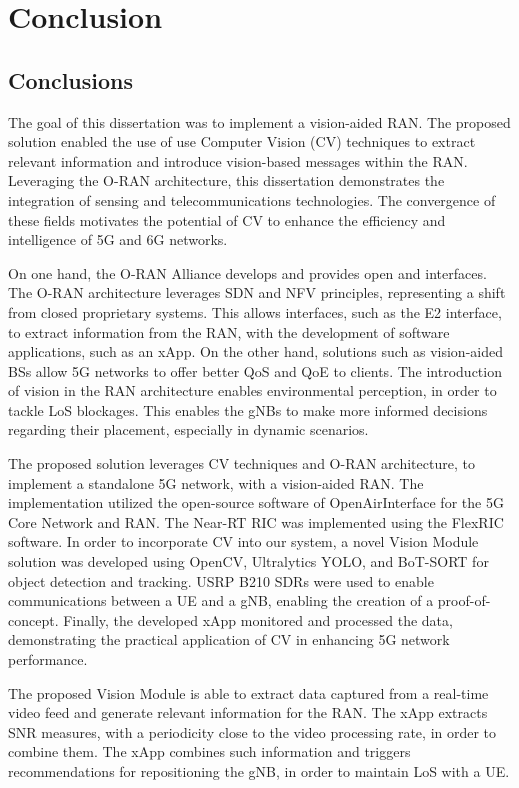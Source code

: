 \chapter{Conclusion}\label{ch:conclusion}

\section{Conclusions}\label{sec:conclusions}
The goal of this dissertation was to implement a vision-aided RAN\@.
The proposed solution enabled the use of use Computer Vision (CV) techniques to extract relevant information and introduce vision-based messages within the RAN\@.
Leveraging the O-RAN architecture, this dissertation demonstrates the integration of sensing and telecommunications technologies.
The convergence of these fields motivates the potential of CV to enhance the efficiency and intelligence of 5G and 6G networks.

On one hand, the O-RAN Alliance develops and provides open and interfaces.
The O-RAN architecture leverages SDN and NFV principles, representing a shift from closed proprietary systems.
This allows interfaces, such as the E2 interface, to extract information from the RAN, with the development of software applications, such as an xApp.
On the other hand, solutions such as vision-aided BSs allow 5G networks to offer better QoS and QoE to clients.
The introduction of vision in the RAN architecture enables environmental perception, in order to tackle LoS blockages.
This enables the gNBs to make more informed decisions regarding their placement, especially in dynamic scenarios.

The proposed solution leverages CV techniques and O-RAN architecture, to implement a standalone 5G network, with a vision-aided RAN\@.
The implementation utilized the open-source software of OpenAirInterface for the 5G Core Network and RAN\@.
The Near-RT RIC was implemented using the FlexRIC software.
In order to incorporate CV into our system, a novel Vision Module solution was developed using OpenCV, Ultralytics YOLO, and BoT-SORT for object detection and tracking.
USRP B210 SDRs were used to enable communications between a UE and a gNB, enabling the creation of a proof-of-concept.
Finally, the developed xApp monitored and processed the data, demonstrating the practical application of CV in enhancing 5G network performance.

The proposed Vision Module is able to extract data captured from a real-time video feed and generate relevant information for the RAN\@.
The xApp extracts SNR measures, with a periodicity close to the video processing rate, in order to combine them.
The xApp combines such information and triggers recommendations for repositioning the gNB, in order to maintain LoS with a UE\@.

